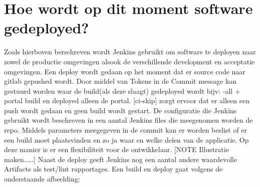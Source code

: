 \section{Hoe wordt op dit moment software gedeployed?}\label{sec:hoe-wordt-op-dit-moment-software-gedeployed?}
Zoals hierboven berschreven wordt Jenkins gebruikt om software te deployen naar zowel de productie omgevingen alsook de verschillende development en acceptatie omgevingen.
Een deploy wordt gedaan op het moment dat er source code naar gitlab gepushed wordt.
Door middel van Tokens in de Commit message kan gestuurd worden waar de build(als deze slaagt) gedeployed wordt bijv: {-all + portal} build en deployed alleen de portal. [ci-skip] zorgt ervoor dat er alleen een push wordt gedaan en geen build wordt gestart.
De configuratie die Jenkins gebruikt wordt beschreven in een aantal Jenkins files die meegenomen worden de repo. Middels parameters meegegeven in de commit kan er worden beslist of er een build moet plaatsvinden en zo ja waar en welke delen van de applicatie. Op deze manier is er een flexibiliteit voor de ontwikkelaar.
[NOTE Illustratie maken.....]
Naast de deploy geeft Jenkins nog een aantal andere waardevolle Artifacts als test/lint rapportages.
Een build en deploy gaat volgens de onderstaande afbeelding:

